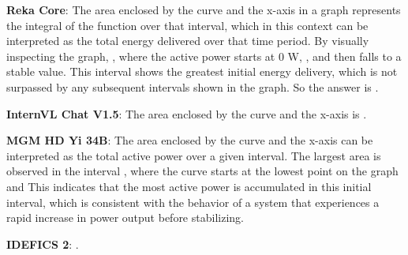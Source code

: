 \begin{wronganswer}
\textbf{Reka Core}: \small{ The area enclosed by the curve and the x-axis in a graph represents the integral of the function over that interval, which in this context can be interpreted as the total energy delivered over that time period. By visually inspecting the graph, , where the active power starts at 0 W, , and then falls to a stable value. This interval shows the greatest initial energy delivery, which is not surpassed by any subsequent intervals shown in the graph. So the answer is \red{[0, 100]}.}
\end{wronganswer}

\begin{wronganswer}
\textbf{InternVL Chat V1.5}: \small{The area enclosed by the curve and the x-axis is .}
\end{wronganswer}

\begin{wronganswer}
\textbf{MGM HD Yi 34B}: \small{The area enclosed by the curve and the x-axis can be interpreted as the total active power over a given interval. The largest area is observed in the interval \red{[0, 100]}, where the curve starts at the lowest point on the graph and  This indicates that the most active power is accumulated in this initial interval, which is consistent with the behavior of a system that experiences a rapid increase in power output before stabilizing.}
\end{wronganswer}

\begin{wronganswer}
\textbf{IDEFICS 2}: \small{\red{[0, 100]}.}
\end{wronganswer}
